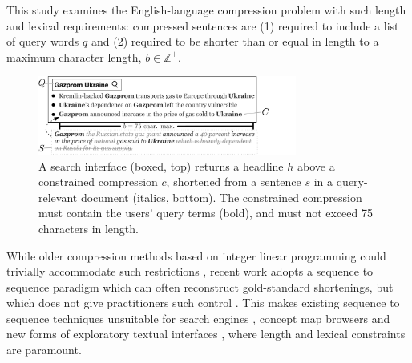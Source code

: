 \documentclass[11pt,a4paper]{article}
\begin{document}
This study examines the English-language compression problem with such length and lexical requirements: compressed sentences are (1) required to include a list of query words $q$ and (2) required to be shorter than or equal in length to a maximum character length, $b \in \mathbb{Z}^{+}$. 

\begin{figure}[htb!]
\includegraphics[width=8.5cm]{qf.pdf}
\caption{A search interface (boxed, top) returns a headline $h$ above a constrained compression $c$, shortened from a sentence $s$ in a query-relevant document (italics, bottom). The constrained compression must contain the users' query terms (bold), and must not exceed 75 characters in length.}
\label{f:qf}
\end{figure}


While older compression methods based on integer linear programming could trivially accommodate such restrictions \cite{clarke2008global,filippova2013overcoming}, recent work adopts a sequence to sequence paradigm which can often reconstruct gold-standard shortenings, but which does not give practitioners such control \cite{filippova2015sentence}. This makes existing sequence to sequence techniques unsuitable for search engines \cite{hearst2009search}, concept map browsers \cite{falke2017graphdocexplore} and new forms of exploratory textual interfaces \cite{marchionini2006exploratory}, where length and lexical constraints are paramount. 
\end{document}
